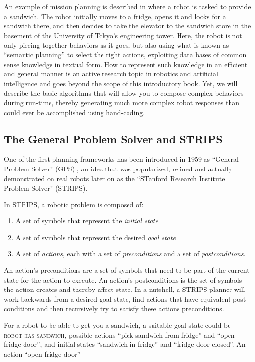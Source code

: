 An example of mission planning is described in \cite{saito2011semantic} where a robot is tasked to provide a sandwich. The robot initially moves to a fridge, opens it and looks for a sandwich there, and then decides to take the elevator to the sandwich store in the basement of the University of Tokyo's engineering tower. Here, the robot is not only piecing together behaviors as it goes, but also using what is known as ``semantic planning'' to select the right actions, exploiting data bases of common sense knowledge in textual form. How to represent such knowledge in an efficient and general manner is an active research topic in robotics and artificial intelligence and goes beyond the scope of this introductory book. Yet, we will describe the basic algorithms that will allow you to compose complex behaviors during run-time, thereby generating much more complex robot responses than could ever be accomplished using hand-coding.

\subsection{The General Problem Solver and STRIPS}
One of the first planning frameworks has been introduced in 1959 as ``General Problem Solver'' (GPS) \cite{newell1959report,}, an idea that was popularized, refined and actually demonstrated on real robots later on as the ``STanford Research Institute Problem Solver'' (STRIPS)\cite{fikes1971strips}.

In STRIPS, a robotic problem is composed of:

\begin{enumerate}
\item A set of symbols that represent the \emph{initial state}
\item A set of symbols that represent the desired \emph{goal state}
\item A set of \emph{actions}, each with a set of \emph{preconditions} and a set of \emph{postconditions}.
\end{enumerate}

An action's preconditions are a set of symbols that need to be part of the current state for the action to execute. An action's postconditions is the set of symbols the action creates and thereby affect state. In a nutshell, a STRIPS planner will work backwards from a desired goal state, find actions that have equivalent post-conditions and then recursively try to satisfy these actions preconditions.

For a robot to be able to get you a sandwich, a suitable goal state could be \textsc{robot has sandwich}, possible actions ``pick sandwich from fridge'' and ``open fridge door'', and initial states ``sandwich in fridge'' and ``fridge door closed''.  An action ``open fridge door''

